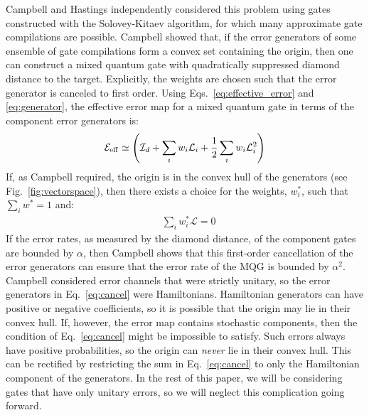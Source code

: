 \documentclass[aps,nofootinbib,pra,notitlepage,twocolumn]{revtex4-1}
\begin{document}
Campbell \cite{Campbell2017} and Hastings \cite{1612.01011} independently considered this problem using gates constructed with the Solovey-Kitaev algorithm, for which many approximate gate compilations are possible. Campbell showed that, if the error generators of some ensemble of gate compilations form a convex set containing the origin, then one can construct a mixed quantum gate with quadratically suppressed diamond distance to the target. Explicitly, the weights are chosen such that the error generator is canceled to first order. Using Eqs.~\eqref{eq:effective_error} and \eqref{eq:generator}, the effective error map for a mixed quantum gate in terms of the component error generators is:
\begin{align}
	\label{eq:generators_and_effective_error}
	\mathcal{E}_{\rm eff} \simeq \left(\mathcal{I}_d + \sum_i w_i \mathcal{L}_i + \frac{1}{2} \sum_i w_i \mathcal{L}_i^2\right)
\end{align}
If, as Campbell required, the origin is in the convex hull of the generators (see Fig.~\ref{fig:vectorspace}), then there exists a choice for the weights, $w_i^*$, such that $\sum_i w^*=1$ and:
\begin{align}
	\label{eq:cancel}
	&\sum_i w_i^* \mathcal{L} = 0
\end{align}
If the error rates, as measured by the diamond distance, of the component gates are bounded by $\alpha$, then Campbell shows that this first-order cancellation of the error generators can ensure that the error rate of the MQG is bounded by $\alpha^2$. Campbell considered error channels that were strictly unitary, so the error generators in Eq.~\ref{eq:cancel} were Hamiltonians. Hamiltonian generators can have positive or negative coefficients, so it is possible that the origin may lie in their convex hull. If, however, the error map contains stochastic components, then the condition of Eq.~\ref{eq:cancel} might be impossible to satisfy. Such errors always have positive probabilities, so the origin can \emph{never} lie in their convex hull. This can be rectified by restricting the sum in Eq.~\eqref{eq:cancel} to only the Hamiltonian component of the generators. In the rest of this paper, we will be considering gates that have only unitary errors, so we will neglect this complication going forward. 
\end{document}
